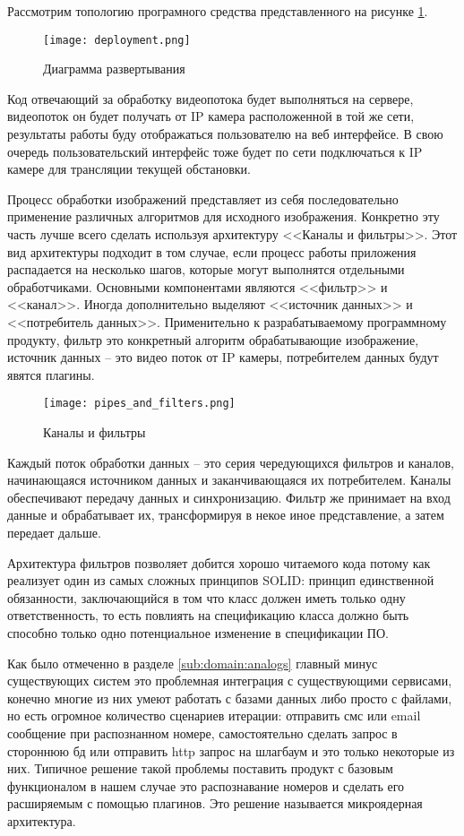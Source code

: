 Рассмотрим топологию програмного средства представленного на рисунке \ref{fig:arch_arch:deployment}.
\begin{figure}[ht] 
    \centering
    \texttt{[image: deployment.png]}  
    \caption{Диаграмма развертывания}
    \label{fig:arch_arch:deployment}
\end{figure}

Код отвечающий за обработку видеопотока будет выполняться на сервере, видеопоток он будет получать от IP камера расположенной в той же сети, результаты работы буду отображаться пользователю на веб интерфейсе. В свою очередь пользовательский интерфейс тоже будет по сети подключаться к IP камере для трансляции текущей обстановки.

Процесс обработки изображений представляет из себя последовательно применение различных алгоритмов для исходного изображения. Конкретно эту часть лучше всего сделать используя архитектуру <<Каналы и фильтры>>. Этот вид архитектуры подходит в том случае, если процесс работы приложения распадается на несколько шагов, которые могут выполнятся отдельными обработчиками. Основными компонентами являются <<фильтр>> и <<канал>>. Иногда дополнительно выделяют <<источник данных>> и <<потребитель данных>>. Применительно к разрабатываемому программному продукту, фильтр это конкретный алгоритм обрабатывающие изображение, источник данных -- это видео поток от IP камеры, потребителем данных будут явятся плагины.

\begin{figure}[ht] 
    \centering
    \texttt{[image: pipes\_and\_filters.png]}  
    \caption{Каналы и фильтры}
    \label{fig:arch_arch:pipes_and_filters}
\end{figure}

Каждый поток обработки данных – это серия чередующихся фильтров и каналов, начинающаяся источником данных и заканчивающаяся их потребителем. Каналы обеспечивают передачу данных и синхронизацию. Фильтр же принимает на вход данные и обрабатывает их, трансформируя в некое иное представление, а затем передает дальше.

Архитектура фильтров позволяет добится хорошо читаемого кода потому как реализует один из самых сложных принципов SOLID: принцип единственной обязанности, заключающийся в том что класс должен иметь только одну ответственность, то есть повлиять на спецификацию класса должно быть способно только одно потенциальное изменение в спецификации ПО. 

Как было отмеченно в разделе \ref{sub:domain:analogs} главный минус существующих систем это проблемная интеграция с существующими сервисами, конечно многие из них умеют работать с базами данных либо просто с файлами, но есть огромное количество сценариев итерации: отправить смс или email сообщение при распознанном номере, самостоятельно сделать запрос в стороннюю бд или отправить http запрос на шлагбаум и это только некоторые из них. Типичное решение такой проблемы поставить продукт с базовым функционалом в нашем случае это распознавание номеров и сделать его расширяемым с помощью плагинов. Это решение называется микроядерная архитектура. 

